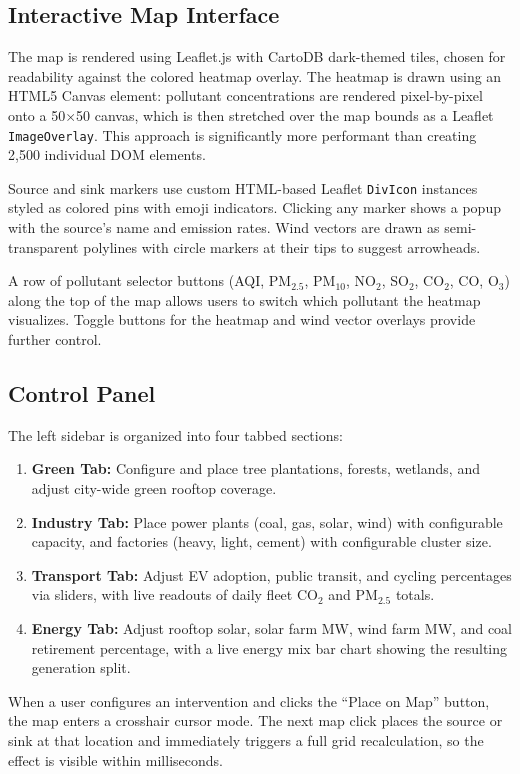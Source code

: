 \documentclass[a4paper, 12pt]{report}
\begin{document}
\subsection{Interactive Map Interface}
The map is rendered using Leaflet.js with CartoDB dark-themed tiles, chosen for readability against the colored heatmap overlay. The heatmap is drawn using an HTML5 Canvas element: pollutant concentrations are rendered pixel-by-pixel onto a 50$\times$50 canvas, which is then stretched over the map bounds as a Leaflet \texttt{ImageOverlay}. This approach is significantly more performant than creating 2,500 individual DOM elements.

Source and sink markers use custom HTML-based Leaflet \texttt{DivIcon} instances styled as colored pins with emoji indicators. Clicking any marker shows a popup with the source's name and emission rates. Wind vectors are drawn as semi-transparent polylines with circle markers at their tips to suggest arrowheads.

A row of pollutant selector buttons (AQI, PM$_{2.5}$, PM$_{10}$, NO$_2$, SO$_2$, CO$_2$, CO, O$_3$) along the top of the map allows users to switch which pollutant the heatmap visualizes. Toggle buttons for the heatmap and wind vector overlays provide further control.

\subsection{Control Panel}
The left sidebar is organized into four tabbed sections:

\begin{enumerate}
\item \textbf{Green Tab:} Configure and place tree plantations, forests, wetlands, and adjust city-wide green rooftop coverage.
\item \textbf{Industry Tab:} Place power plants (coal, gas, solar, wind) with configurable capacity, and factories (heavy, light, cement) with configurable cluster size.
\item \textbf{Transport Tab:} Adjust EV adoption, public transit, and cycling percentages via sliders, with live readouts of daily fleet CO$_2$ and PM$_{2.5}$ totals.
\item \textbf{Energy Tab:} Adjust rooftop solar, solar farm MW, wind farm MW, and coal retirement percentage, with a live energy mix bar chart showing the resulting generation split.
\end{enumerate}

When a user configures an intervention and clicks the ``Place on Map'' button, the map enters a crosshair cursor mode. The next map click places the source or sink at that location and immediately triggers a full grid recalculation, so the effect is visible within milliseconds.
\end{document}
